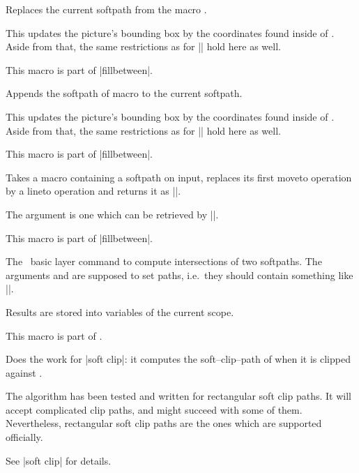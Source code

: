 \begin{command}{\pgfsetpathandBB{}}
	Replaces the current softpath from the macro .

	This updates the picture's bounding box by the coordinates found inside of . Aside from that, the same restrictions as for |\pgfsetpath| hold here as well.

	This macro is part of |fillbetween|.
\end{command}

\begin{command}{\pgfaddpathandBB{}}
	Appends the softpath of macro  to the current softpath.

	This updates the picture's bounding box by the coordinates found inside of . Aside from that, the same restrictions as for |\pgfsetpath| hold here as well.

	This macro is part of |fillbetween|.
\end{command}

\begin{command}{\pgfpathreplacefirstmoveto{}}
	Takes a macro containing a softpath on input, replaces its first moveto operation by a lineto operation and returns it as |\pgfretval|.

	The argument  is one which can be retrieved by |\pgfgetpath|.

	This macro is part of |fillbetween|.
\end{command}

\begin{command}{\pgfintersectionofpaths{}}
	The \pgfname\ basic layer command to compute intersections of two softpaths. The arguments  and  are supposed to set paths, i.e.\ they should contain something like |\pgfsetpath{\somesoftpath}|.

	Results are stored into variables of the current scope.

	This macro is part of \pgfname.
\end{command}

\begin{command}{\pgfpathcomputesoftclippath{}}
	Does the work for |soft clip|: it computes the soft--clip--path of  when it is clipped against .
	
	The algorithm has been tested and written for rectangular soft clip paths. It will accept complicated clip paths, and might succeed with some of them. Nevertheless, rectangular soft clip paths are the ones which are supported officially.

	See |soft clip| for details.
\end{command}
\endgroup
